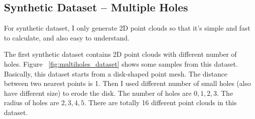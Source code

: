 \documentclass[10pt]{article}
\begin{document}
\subsection{Synthetic Dataset -- Multiple Holes}
For synthetic dataset, I only generate 2D point clouds so that it's simple and fast to calculate, and also easy to understand.

The first synthetic dataset contains 2D point clouds with different number of holes.
Figure ~\ref{fig:multiholes_dataset} shows some samples from this dataset.
Basically, this dataset starts from a disk-shaped point mesh.
The distance between two nearest points is 1.
Then I used different number of small holes (also have different size) to erode the disk.
The number of holes are $0, 1, 2, 3$.
The radius of holes are $2, 3, 4, 5$. 
There are totally 16 different point clouds in this dataset.
\end{document}
